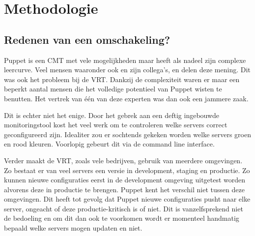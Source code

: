 
\chapter{Methodologie}
\label{ch:methodologie}


\section{Redenen van een omschakeling?}
\label{sec:methodologie-redenen-omschakeling}

Puppet is een CMT met vele mogelijkheden maar heeft als nadeel zijn complexe leercurve. Veel mensen waaronder ook \textcite{danAnsiblevsPuppet} en zijn collega's, \textcite{martinAnsiblevsPuppet} en \textcite{AliAnsiblevsPuppet} delen deze mening. Dit was ook het probleem bij de VRT. Dankzij de complexiteit waren er maar een beperkt aantal mensen die het volledige potentieel van Puppet wisten te benutten. Het vertrek van \'e\'en van deze experten was dan ook een jammere zaak.

Dit is echter niet het enige. Door het gebrek aan een deftig ingebouwde monitoringstool kost het veel werk om te controleren welke servers correct geconfigureerd zijn. Idealiter zou er sochtends gekeken worden welke servers groen en rood kleuren. Voorlopig gebeurt dit via de command line interface.  

Verder maakt de VRT, zoals vele bedrijven, gebruik van meerdere omgevingen. Zo bestaat er van veel servers een versie in development, staging en productie. Zo kunnen nieuwe configuraties eerst in de development omgeving uitgetest worden alvorens deze in productie te brengen. Puppet kent het verschil niet tussen deze omgevingen. Dit heeft tot gevolg dat Puppet nieuwe configuraties pusht naar elke server, ongeacht of deze productie-kritisch is of niet. Dit is vanzelfsprekend niet de bedoeling en om dit dan ook te voorkomen wordt er momenteel handmatig bepaald welke servers mogen updaten en niet. 

